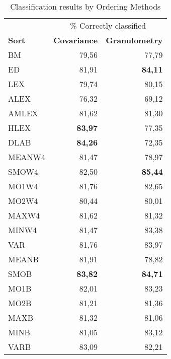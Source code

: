\begin{table}
\caption{Classification results by Ordering Methods}
\label{tab:experiment1_t1}

\begin{tabular}{@{}lrr@{}}
\toprule
&\multicolumn{2}{c}{ \% 
Correctly classified }\\
\cline{2-3}
\textbf{Sort } & \textbf{Covariance} &\textbf{Granulometry } \\ 
\cmidrule{1-3}
BM & 79,56 & 77,79 \\ \hline
ED & 81,91 & \textbf{84,11}  \\ \hline
LEX & 79,74 & 80,15 \\ \hline
ALEX & 76,32   &  69,12  \\ \hline
AMLEX &  81,62   &  81,30  \\ \hline
HLEX &  \textbf{83,97}  &  77,35  \\ \hline
DLAB  & \textbf{84,26}  & 72,35   \\ \hline
MEANW4 & 81,47 & 78,97 \\ \hline %
SMOW4 & 82,50 & \textbf{85,44} \\ \hline %
MO1W4 & 81,76 & 82,65 \\ \hline %
MO2W4 & 80,44 & 80,01 \\ \hline %
MAXW4 & 81,62 & 81,32 \\ \hline %
MINW4 & 81,47 & 83,38 \\ \hline %
VAR   & 81,76 &  83,97  \\ \hline 
MEANB & 81,91 & 78,82 \\ \hline %
SMOB & \textbf{83,82} & \textbf{84,71} \\ \hline %
MO1B & 82,01  & 83,23  \\ \hline %
MO2B & 81,21 &  81,36  \\ \hline %
MAXB & 81,32 & 81,06 \\ \hline %
MINB & 81,05 & 83,12 \\ \hline %
VARB & 83,09 &  82,21  \\ \hline 

\end{tabular}
\end{table}

